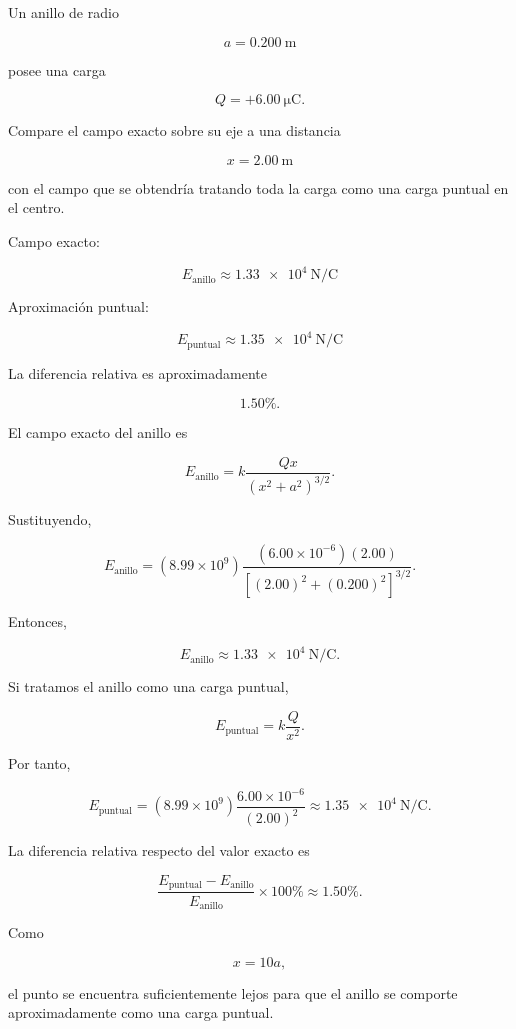 \begin{ejercicio}

Un anillo de radio

\[
a=\SI{0.200}{\metre}
\]

posee una carga

\[
Q=+\SI{6.00}{\micro\coulomb}.
\]

Compare el campo exacto sobre su eje a una distancia

\[
x=\SI{2.00}{\metre}
\]

con el campo que se obtendría tratando toda la carga como una carga puntual en el centro.

\end{ejercicio}

\begin{respuesta}

Campo exacto:

\[
\boxed{E_{\text{anillo}}\approx\SI{1.33e4}{\newton\per\coulomb}}
\]

Aproximación puntual:

\[
\boxed{E_{\text{puntual}}\approx\SI{1.35e4}{\newton\per\coulomb}}
\]

La diferencia relativa es aproximadamente

\[
\boxed{1.50\%}.
\]

\end{respuesta}

\begin{explicacion}

El campo exacto del anillo es

\[
E_{\text{anillo}}
=
k\frac{Qx}{(x^2+a^2)^{3/2}}.
\]

Sustituyendo,

\[
E_{\text{anillo}}
=
(8.99\times10^9)
\frac{(6.00\times10^{-6})(2.00)}
{\left[(2.00)^2+(0.200)^2\right]^{3/2}}.
\]

Entonces,

\[
E_{\text{anillo}}\approx\SI{1.33e4}{\newton\per\coulomb}.
\]

Si tratamos el anillo como una carga puntual,

\[
E_{\text{puntual}}=k\frac{Q}{x^2}.
\]

Por tanto,

\[
E_{\text{puntual}}
=
(8.99\times10^9)
\frac{6.00\times10^{-6}}{(2.00)^2}
\approx\SI{1.35e4}{\newton\per\coulomb}.
\]

La diferencia relativa respecto del valor exacto es

\[
\frac{E_{\text{puntual}}-E_{\text{anillo}}}
{E_{\text{anillo}}}\times100\%
\approx1.50\%.
\]

Como

\[
x=10a,
\]

el punto se encuentra suficientemente lejos para que el anillo se comporte aproximadamente como una carga puntual.

\end{explicacion}


